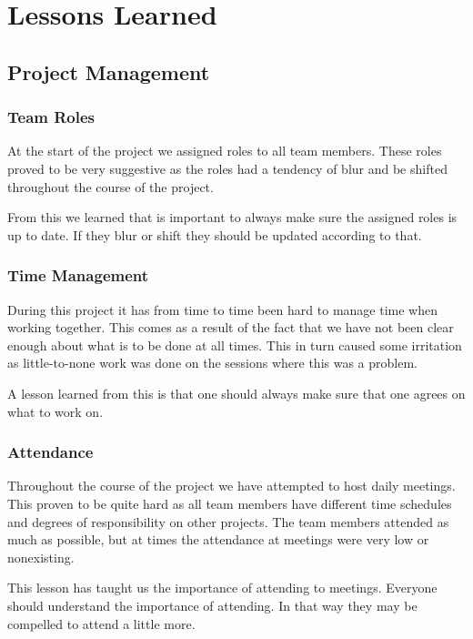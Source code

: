\chapter{Lessons Learned}\label{lessons}
\section{Project Management}
\subsection{Team Roles}
At the start of the project we assigned roles to all team members. These roles proved to be very suggestive as the roles had a tendency of blur and be shifted throughout the course of the project.

From this we learned that is important to always make sure the assigned roles is up to date. If they blur or shift they should be updated according to that. 

\subsection{Time Management}
During this project it has from time to time been hard to manage time when working together. This comes as a result of the fact that we have not been clear enough about what is to be done at all times. This in turn caused some irritation as little-to-none work was done on the sessions where this was a problem.

A lesson learned from this is that one should always make sure that one agrees on what to work on.

\subsection{Attendance}
Throughout the course of the project we have attempted to host daily meetings. This proven to be quite hard as all team members have different time schedules and degrees of responsibility on other projects. The team members attended as much as possible, but at times the attendance at meetings were very low or nonexisting.

This lesson has taught us the importance of attending to meetings. Everyone should understand the importance of attending. In that way they may be compelled to attend a little more.


